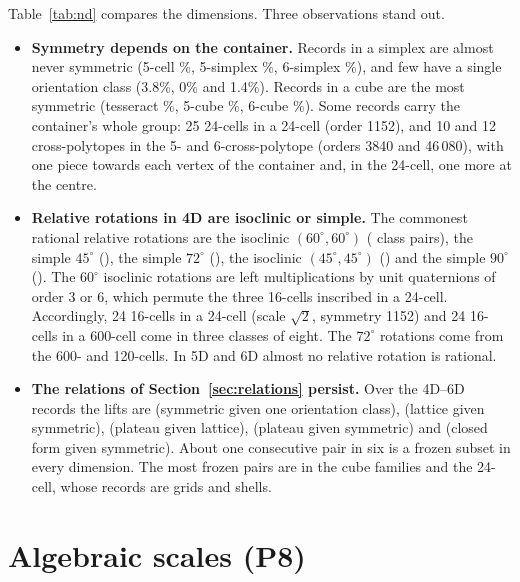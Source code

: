 \documentclass[11pt,a4paper]{article}
\theoremstyle{definition}
\theoremstyle{remark}
\begin{document}
Table~\ref{tab:nd} compares the dimensions. Three observations stand out.
\begin{itemize}
\item \textbf{Symmetry depends on the container.} Records in a simplex are almost never symmetric (5-cell \ndSymCfive\%, 5-simplex \ndSymSxfive\%, 6-simplex \ndSymSxsix\%), and few have a single orientation class (3.8\%, 0\% and 1.4\%). Records in a cube are the most symmetric (tesseract \ndSymCeight\%, 5-cube \ndSymHcfive\%, 6-cube \ndSymHcsix\%). Some records carry the container's whole group: 25 24-cells in a 24-cell (order 1152), and 10 and 12 cross-polytopes in the 5- and 6-cross-polytope (orders 3840 and 46\,080), with one piece towards each vertex of the container and, in the 24-cell, one more at the centre.
\item \textbf{Relative rotations in 4D are isoclinic or simple.} The commonest rational relative rotations are the isoclinic $(60^\circ,60^\circ)$ (\ndIsoSixty{} class pairs), the simple $45^\circ$ (\ndSimpleFortyfive), the simple $72^\circ$ (\ndSimpleSeventytwo), the isoclinic $(45^\circ,45^\circ)$ (\ndIsoFortyfive) and the simple $90^\circ$ (\ndSimpleNinety). The $60^\circ$ isoclinic rotations are left multiplications by unit quaternions of order 3 or 6, which permute the three 16-cells inscribed in a 24-cell. Accordingly, 24 16-cells in a 24-cell (scale $\sqrt2$, symmetry 1152) and 24 16-cells in a 600-cell come in three classes of eight. The $72^\circ$ rotations come from the 600- and 120-cells. In 5D and 6D almost no relative rotation is rational.
\item \textbf{The relations of Section~\ref{sec:relations} persist.} Over the 4D--6D records the lifts are \ndLiftSymOne{} (symmetric given one orientation class), \ndLiftLatSym{} (lattice given symmetric), \ndLiftPlaLat{} (plateau given lattice), \ndLiftPlaSym{} (plateau given symmetric) and \ndLiftCfSym{} (closed form given symmetric). About one consecutive pair in six is a frozen subset in every dimension. The most frozen pairs are in the cube families and the 24-cell, whose records are grids and shells.
\end{itemize}

\section{Algebraic scales (P8)}
\end{document}
